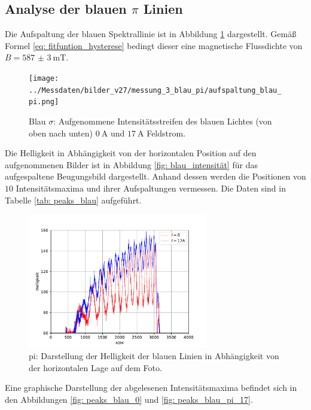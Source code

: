 \subsection{Analyse der blauen $\pi$ Linien}
Die Aufspaltung der blauen Spektrallinie ist in Abbildung \ref{fig: aufspaltung_blau_pi} dargestellt. Gemäß Formel \eqref{eq: fitfuntion_hysterese}
bedingt dieser eine magnetische Flussdichte von $B = \SI{587(3)}{\milli\tesla}$.
\begin{figure}
  \centering
  \texttt{[image: ../Messdaten/bilder\_v27/messung\_3\_blau\_pi/aufspaltung\_blau\_pi.png]}
  \caption{Blau $\sigma$: Aufgenommene Intensitätsstreifen des blauen Lichtes (von oben nach unten) $\SI{0}{\ampere}$ und $\SI{17}{\ampere}$ Feldstrom.}
  \label{fig: aufspaltung_blau_pi}
\end{figure}
Die Helligkeit in Abhängigkeit von der horizontalen Position auf den aufgenommenen Bilder ist in Abbildung \ref{fig: blau_intensität} für das aufgespaltene Beugungsbild dargestellt.
Anhand dessen werden die Positionen von $10$ Intensitätsmaxima und ihrer Aufspaltungen
vermessen. Die Daten sind in Tabelle \ref{tab: peaks_blau} aufgeführt.
\begin{figure}
  \centering
  \includegraphics[width = 0.7\textwidth]{../Messdaten/plots/blau_pi_intensitaet.pdf}
  \caption{pi: Darstellung der Helligkeit der blauen Linien in Abhängigkeit von der horizontalen Lage auf dem Foto.}
  \label{fig: blau_intensität_pi}
\end{figure}

Eine graphische Darstellung der abgelesenen Intensitätsmaxima befindet sich in den Abbildungen \ref{fig: peaks_blau_0} und \ref{fig: peaks_blau_pi_17}.
